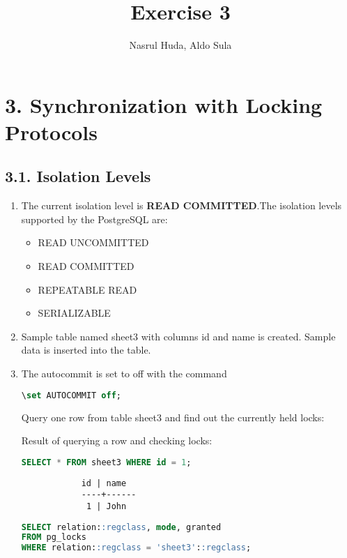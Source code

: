 \documentclass{article}
\begin{document}
    \title{Exercise 3}
    \author{Nasrul Huda, Aldo Sula}
    \maketitle

    \section{3. Synchronization with Locking Protocols}
    \subsection{3.1. Isolation Levels}
    \begin{enumerate}[label=\alph*)]
        \item The current isolation level is \textbf{READ COMMITTED}.The isolation levels supported by the PostgreSQL are:
        \begin{itemize}
            \item READ UNCOMMITTED
            \item READ COMMITTED
            \item REPEATABLE READ
            \item SERIALIZABLE
        \end{itemize}

        \item Sample table named sheet3 with columns id and name is created. Sample data is inserted into the table.
        
        \item The autocommit is set to off with the command \begin{lstlisting}[language=sql]
            \set AUTOCOMMIT off;
        \end{lstlisting}

        Query one row from table sheet3 and find out the currently held locks: 
        
        Result of querying a row and checking locks:
        \begin{lstlisting}[language=sql]
SELECT * FROM sheet3 WHERE id = 1;
        \end{lstlisting}

        \begin{lstlisting}
            id | name 
            ----+------
             1 | John
        \end{lstlisting}

        \begin{lstlisting}[language=sql]
SELECT relation::regclass, mode, granted
FROM pg_locks
WHERE relation::regclass = 'sheet3'::regclass;
        \end{lstlisting}
        

\end{enumerate}
\end{document}
